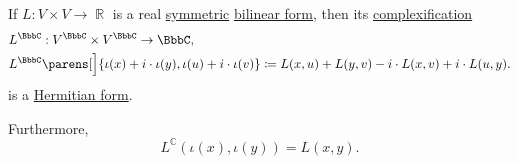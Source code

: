 \begin{proposition}\label{thm:complexification_of_symmetric_bilinear_form}
  If \( L: V \times V \to \BbbR \) is a real \hyperref[def:symmetric_function]{symmetric} \hyperref[def:bilinear_form]{bilinear form}, then its \hyperref[def:complexification]{complexification}
  \begin{equation*}
    \begin{aligned}
      &L^\BbbC: V^\BbbC \times V^\BbbC \to \BbbC, \\
      &L^\BbbC\parens[\Big]{ \iota(x) + i \cdot \iota(y), \iota(u) + i \cdot \iota(v) } \coloneqq L(x, u) + L(y, v) - i \cdot L(x, v) + i \cdot L(u, y).
    \end{aligned}
  \end{equation*}
  is a \hyperref[def:hermitian_form]{Hermitian form}.

  Furthermore,
  \begin{equation*}
    L^\BbbC(\iota(x), \iota(y)) = L(x, y).
  \end{equation*}
\end{proposition}
